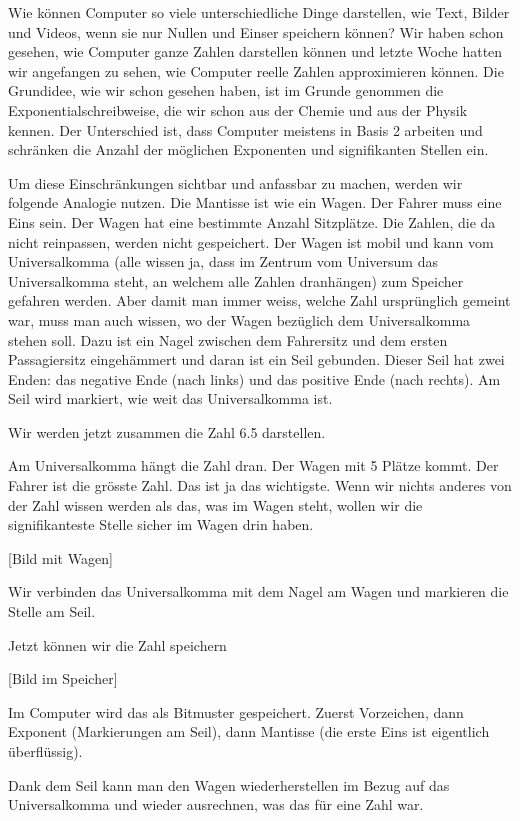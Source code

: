 Wie können Computer so viele unterschiedliche Dinge darstellen, wie Text, Bilder und Videos, wenn sie nur Nullen und Einser speichern können?
Wir haben schon gesehen, wie Computer ganze Zahlen darstellen können und letzte Woche hatten wir angefangen zu sehen, wie Computer reelle Zahlen approximieren können. Die Grundidee, wie wir schon gesehen haben, ist im Grunde genommen die Exponentialschreibweise, die wir schon aus der Chemie und aus der Physik kennen. Der Unterschied ist, dass Computer meistens in Basis 2 arbeiten und schränken die Anzahl der möglichen Exponenten und signifikanten Stellen ein.

Um diese Einschränkungen sichtbar und anfassbar zu machen, werden wir folgende Analogie nutzen.
Die Mantisse ist wie ein Wagen. Der Fahrer muss eine Eins sein. Der Wagen hat eine bestimmte Anzahl Sitzplätze. Die Zahlen, die da nicht reinpassen, werden nicht gespeichert. Der Wagen ist mobil und kann vom Universalkomma (alle wissen ja, dass im Zentrum vom Universum das Universalkomma steht, an welchem alle Zahlen dranhängen) zum Speicher gefahren werden. Aber damit man immer weiss, welche Zahl ursprünglich gemeint war, muss man auch wissen, wo der Wagen bezüglich dem Universalkomma stehen soll. Dazu ist ein Nagel zwischen dem Fahrersitz und dem ersten Passagiersitz eingehämmert und daran ist ein Seil gebunden. Dieser Seil hat zwei Enden: das negative Ende (nach links) und das positive Ende (nach rechts). Am Seil wird markiert, wie weit das Universalkomma ist.

\begin{beispiel}
Wir werden jetzt zusammen die Zahl 6.5 darstellen.

Am Universalkomma hängt die Zahl dran.
Der Wagen mit 5 Plätze kommt. Der Fahrer ist die grösste Zahl. Das ist ja das wichtigste. Wenn wir nichts anderes von der Zahl wissen werden als das, was im Wagen steht, wollen wir die signifikanteste Stelle sicher im Wagen drin haben.

[Bild mit Wagen]

Wir verbinden das Universalkomma mit dem Nagel am Wagen und markieren die Stelle am Seil.

Jetzt können wir die Zahl speichern

[Bild im Speicher]

Im Computer wird das als Bitmuster gespeichert. Zuerst Vorzeichen, dann Exponent (Markierungen am Seil), dann Mantisse (die erste Eins ist eigentlich überflüssig).

Dank dem Seil kann man den Wagen wiederherstellen im Bezug auf das Universalkomma und wieder ausrechnen, was das für eine Zahl war.

\end{beispiel}

